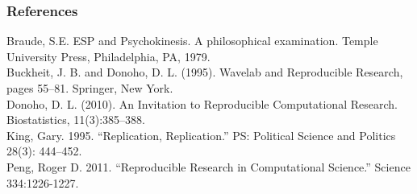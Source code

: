 \documentclass{beamer}\usepackage{graphicx, color}
\begin{document}



\begin{frame}[allowframebreaks]
  \frametitle{References}
  Braude, S.E. ESP and Psychokinesis. A philosophical examination. Temple University Press, Philadelphia, PA, 1979. \\[0.25cm]
  Buckheit, J. B. and Donoho, D. L. (1995). Wavelab and Reproducible Research, pages 55–81. Springer, New York. \\[0.25cm]
  Donoho, D. L. (2010). An Invitation to Reproducible Computational Research. Biostatistics, 11(3):385–388. \\[0.25cm]
  King, Gary. 1995. “Replication, Replication.” PS: Political Science and Politics 28(3): 444–452. \\[0.25cm] 
  Peng, Roger D. 2011. “Reproducible Research in Computational Science.” Science 334:1226-1227.
\end{frame}
\end{document}
